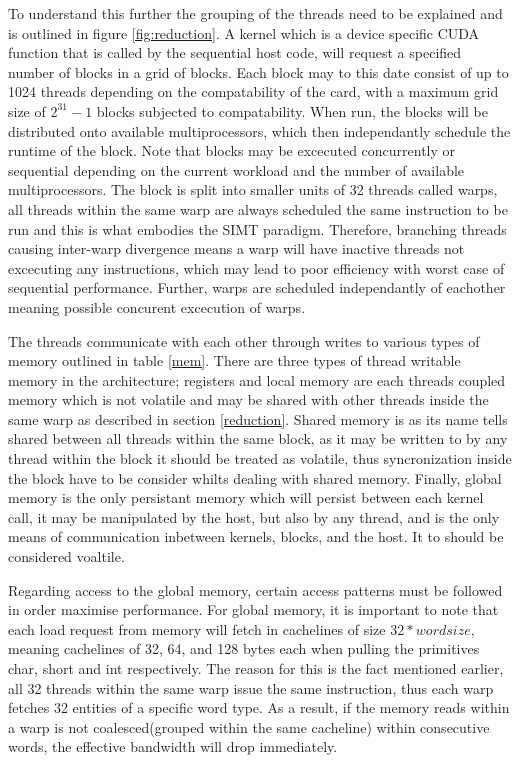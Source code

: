\documentclass{llncs}
\begin{document}
To understand this further the grouping of the threads need to be explained and is outlined in figure \ref{fig:reduction}.
A kernel which is a device specific CUDA function that is called by the sequential host code,
will request a specified number of blocks in a grid of blocks.
Each block may to this date consist of up to 1024 threads depending on the compatability of the card, with a maximum
grid size of $2^{31}-1$ blocks subjected to compatability. When run, the blocks will be distributed onto available multiprocessors,
which then independantly schedule the runtime of the block. Note that blocks may be excecuted concurrently or sequential depending on
the current workload and the number of available multiprocessors.
The block is split into smaller units of 32 threads called warps, all threads within the same warp are always scheduled
the same instruction to be run and this is what embodies the SIMT paradigm. 
Therefore, branching threads causing inter-warp divergence means a warp will have inactive threads not excecuting any instructions, 
which may lead to poor efficiency with worst case of sequential performance. Further, warps are scheduled independantly of eachother
meaning possible concurent excecution of warps.

The threads communicate with each other through writes to various types of memory outlined in table \ref{mem}.
There are three types of thread writable memory in the architecture; registers and local memory are each threads
coupled memory which is not volatile and may be shared with other threads inside the same warp as described in section \ref{reduction}. 
Shared memory is as its name tells shared between all threads within the same block, as it may be written to by any thread within the block
it should be treated as volatile, thus syncronization inside the block have to be consider whilts dealing with shared memory.
Finally, global memory is the only persistant memory which will persist between each kernel call, it may be manipulated by the host,
but also by any thread, and is the only means of communication inbetween kernels, blocks, and the host. It to should be considered voaltile.

Regarding access to the global memory, certain access patterns must be followed in order maximise performance. 
For global memory, it is important to note that each load request from memory will fetch in cachelines of size $32*wordsize$,
meaning cachelines of 32, 64, and 128 bytes each when pulling the primitives char, short and int respectively.
The reason for this is the fact mentioned earlier, all 32 threads within the same warp issue the same instruction, 
thus each warp fetches 32 entities of a specific word type.
As a result, if the memory reads within a warp is not coalesced(grouped within the same cacheline) within consecutive words, the effective bandwidth will drop immediately.
\end{document}
